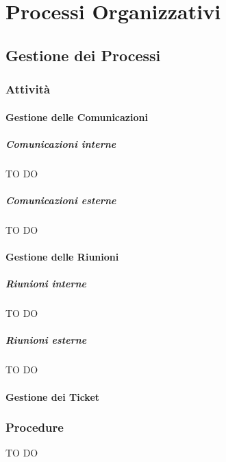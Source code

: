 %



\section{Processi Organizzativi}
	\subsection{Gestione dei Processi}
		\subsubsection{Attività}
			\paragraph{Gestione delle Comunicazioni}
				\subparagraph{Comunicazioni interne}
TO DO				
				\subparagraph{Comunicazioni esterne}
TO DO				
			\paragraph{Gestione delle Riunioni}
				\subparagraph{Riunioni interne}
TO DO				
				\subparagraph{Riunioni esterne}
TO DO				

			\paragraph{Gestione dei Ticket}
			
		\subsubsection{Procedure}
TO DO
